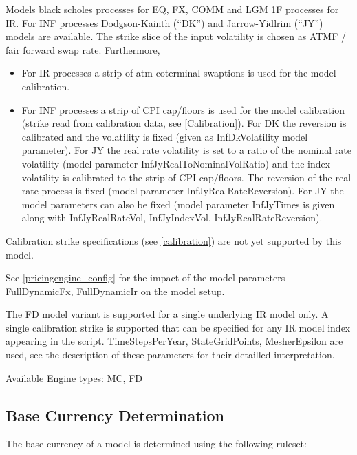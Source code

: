 Models black scholes processes for EQ, FX, COMM and LGM 1F processes for IR. For INF processes Dodgson-Kainth (``DK'')
and Jarrow-Yidlrim (``JY'') models are available. The strike slice of the input volatility is chosen as ATMF / fair
forward swap rate. Furthermore,

\begin{itemize}
\item For IR processes a strip of atm coterminal swaptions is used for the model calibration.
\item For INF processes a strip of CPI cap/floors is used for the model calibration (strike read from calibration data,
  see \ref{Calibration}). For DK the reversion is calibrated and the volatility is fixed (given as InfDkVolatility model
  parameter). For JY the real rate volatility is set to a ratio of the nominal rate volatility (model parameter
  InfJyRealToNominalVolRatio) and the index volatility is calibrated to the strip of CPI cap/floors. The reversion of
  the real rate process is fixed (model parameter InfJyRealRateReversion). For JY the model parameters can also be fixed
  (model parameter InfJyTimes is given along with InfJyRealRateVol, InfJyIndexVol, InfJyRealRateReversion).
\end{itemize}

Calibration strike specifications (see \ref{calibration}) are not yet supported by this model.

See \ref{pricingengine_config} for the impact of the model parameters FullDynamicFx, FullDynamicIr on the model setup.

The FD model variant is supported for a single underlying IR model only. A single calibration strike is supported that
can be specified for any IR model index appearing in the script. TimeStepsPerYear, StateGridPoints, MesherEpsilon are
used, see the description of these parameters for their detailled interpretation.

\smallskip
Available Engine types: MC, FD

\subsection{Base Currency Determination}\label{baseccy_determination}

The base currency of a model is determined using the following ruleset:

